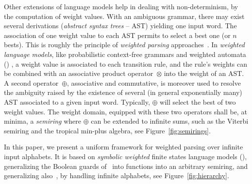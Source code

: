 Other extensions of language models  %
help in dealing with non-determinism, by the computation of weight values.
With an ambiguous grammar, there may exist several derivations
(\emph{abstract syntax trees} -- AST) %
yielding one input word. %
The association of one weight value %
to each AST permits to select a best one (or $n$ bests). %
This is roughly the principle of \emph{weighted parsing}
approaches~\cite{Goodman99SemiringParsing,Nederhof03weightedParsing,MorbitzVogler19weighted-parsing}.
In \emph{weighted language models},
like \eg probabilistic context-free grammars %
and weighted automata (\WA) \cite{Droste09handbook},
a weight value is associated to each transition rule, %
and the rule's weights can be combined with an
associative product operator~$\otimes$ into the weight of an AST.
A second operator~$\oplus$, associative and commutative,
is moreover used to resolve the ambiguity raised by the existence
of several (in general exponentially many) AST
associated to a given input word.
Typically, $\oplus$ will select the best of two weight values.
The weight domain, equipped with these two operators shall be, at minima,
a \emph{semiring} %
where $\oplus$ can be extended to infinite sums,
such as the Viterbi semiring and the tropical min-plus algebra, see Figure~\ref{fig:semirings}.


In this paper, we present a uniform framework for weighted parsing over infinite input alphabets.
It is based on \emph{symbolic weighted} finite states language models (\swM),
generalizing the Boolean guards of~\SA %
into functions into an arbitrary semiring,
and generalizing also~\WA, by handling infinite alphabets, see Figure~\ref{fig:hierarchy}.


